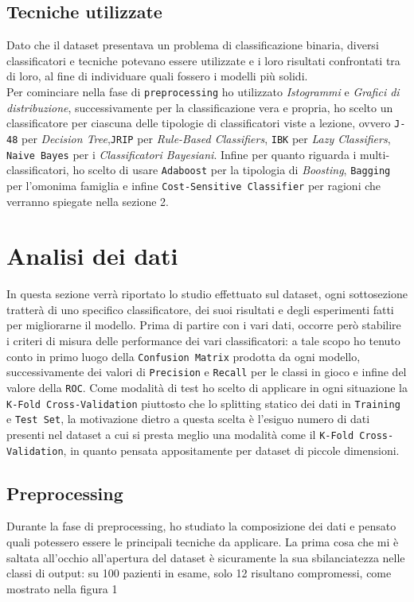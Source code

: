   \subsection{Tecniche utilizzate}
  Dato che il dataset presentava un problema di classificazione binaria, diversi classificatori e tecniche potevano essere utilizzate e i loro risultati confrontati tra di loro, al fine di individuare quali fossero i modelli più solidi.\\
  Per cominciare nella fase di \texttt{preprocessing} ho utilizzato \textit{Istogrammi} e \textit{Grafici di distribuzione}, successivamente per la classificazione vera e propria, ho scelto un classificatore per ciascuna delle tipologie di classificatori viste a lezione, ovvero \texttt{J-48} per \textit{Decision Tree},\texttt{JRIP} per \textit{Rule-Based Classifiers}, \texttt{IBK} per \textit{Lazy Classifiers}, \texttt{Naive Bayes} per i \textit{Classificatori Bayesiani}.
  Infine per quanto riguarda i multi-classificatori, ho scelto di usare \texttt{Adaboost} per la tipologia di \textit{Boosting}, \texttt{Bagging} per l'omonima famiglia e infine \texttt{Cost-Sensitive Classifier} per ragioni che verranno spiegate nella sezione 2.
  \section{Analisi dei dati}
  In questa sezione verrà riportato lo studio effettuato sul dataset, ogni sottosezione tratterà di uno specifico classificatore, dei suoi risultati e degli esperimenti fatti per migliorarne il modello.
  Prima di partire con i vari dati, occorre però stabilire i criteri di misura delle performance dei vari classificatori: a tale scopo ho tenuto conto in primo luogo della \texttt{Confusion Matrix} prodotta da ogni modello, successivamente dei valori di \texttt{Precision} e \texttt{Recall} per le classi in gioco e infine del valore della \texttt{ROC}.
  Come modalità di test ho scelto di applicare in ogni situazione la \texttt{K-Fold Cross-Validation} piuttosto che lo splitting statico dei dati in \texttt{Training} e \texttt{Test Set}, la motivazione dietro a questa scelta è l'esiguo numero di dati presenti nel dataset a cui si presta meglio una modalità come il \texttt{K-Fold Cross-Validation}, in quanto pensata appositamente per dataset di piccole dimensioni.
  \subsection{Preprocessing}
  Durante la fase di preprocessing, ho studiato la composizione dei dati e pensato quali potessero essere le principali tecniche da applicare.
  La prima cosa che mi è saltata all'occhio all'apertura del dataset è sicuramente la sua sbilanciatezza nelle classi di output: su 100 pazienti in esame, solo 12 risultano compromessi, come mostrato nella figura 1
  
